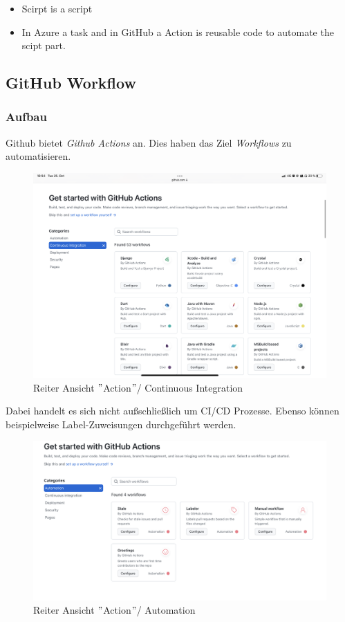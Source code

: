 \begin{itemize}
	\item Scirpt is a script
	\item In Azure a task and in GitHub a Action is reusable code to automate the scipt part.
\end{itemize}


\subsection{GitHub Workflow}
\subsubsection{Aufbau}
Github bietet \textit{Github Actions} an. Dies haben das Ziel \textit{Workflows} zu automatisieren. 

\begin{figure}[H]
	\centering
	\includegraphics[scale = 0.2]{attachment/chapter_2/Scc098}
	\caption{Reiter Ansicht $"$Action$"$/ Continuous Integration}
\end{figure}

Dabei handelt es sich nicht außschließlich um CI/CD Prozesse. Ebenso können beispielweise Label-Zuweisungen durchgeführt werden.


\begin{figure}[H]
	\centering
	\includegraphics[scale = 0.2]{attachment/chapter_2/Scc099}
	\caption{Reiter Ansicht $"$Action$"$/ Automation}
\end{figure}

